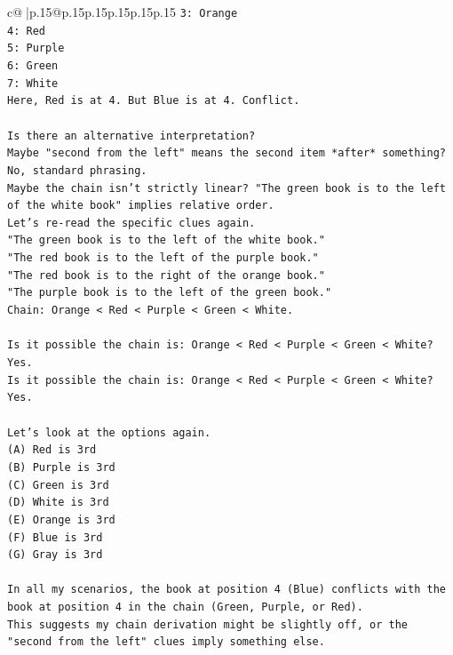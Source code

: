 \documentclass{article}
\begin{document}
{\begin{supertabular}{c@{$\;$}|p{.15\linewidth}@{}p{.15\linewidth}p{.15\linewidth}p{.15\linewidth}p{.15\linewidth}p{.15\linewidth}}
{{{\texttt{3: Orange} \\
\texttt{4: Red} \\
\texttt{5: Purple} \\
\texttt{6: Green} \\
\texttt{7: White} \\
\texttt{Here, Red is at 4. But Blue is at 4. Conflict.} \\
\\ 
\texttt{Is there an alternative interpretation?} \\
\texttt{Maybe "second from the left" means the second item *after* something? No, standard phrasing.} \\
\texttt{Maybe the chain isn't strictly linear? "The green book is to the left of the white book" implies relative order.} \\
\texttt{Let's re{-}read the specific clues again.} \\
\texttt{"The green book is to the left of the white book."} \\
\texttt{"The red book is to the left of the purple book."} \\
\texttt{"The red book is to the right of the orange book."} \\
\texttt{"The purple book is to the left of the green book."} \\
\texttt{Chain: Orange < Red < Purple < Green < White.} \\
\\ 
\texttt{Is it possible the chain is: Orange < Red < Purple < Green < White? Yes.} \\
\texttt{Is it possible the chain is: Orange < Red < Purple < Green < White? Yes.} \\
\\ 
\texttt{Let's look at the options again.} \\
\texttt{(A) Red is 3rd} \\
\texttt{(B) Purple is 3rd} \\
\texttt{(C) Green is 3rd} \\
\texttt{(D) White is 3rd} \\
\texttt{(E) Orange is 3rd} \\
\texttt{(F) Blue is 3rd} \\
\texttt{(G) Gray is 3rd} \\
\\ 
\texttt{In all my scenarios, the book at position 4 (Blue) conflicts with the book at position 4 in the chain (Green, Purple, or Red).} \\
\texttt{This suggests my chain derivation might be slightly off, or the "second from the left" clues imply something else.} \\
}}}
\end{supertabular}}
\end{document}
